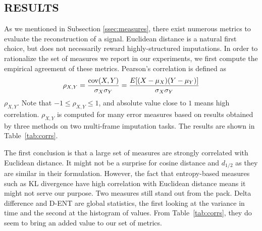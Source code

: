 \documentclass{article}
\begin{document}
\subsection{RESULTS}
\label{ssec:results}
As we mentioned in Subsection \ref{ssec:measures}, there exist
numerous metrics to evaluate the reconstruction of a signal. Euclidean
distance is a natural first choice, but does not necessarily reward
highly-structured imputations. In order to rationalize the set of
measures we report in our experiments, we first compute the
empirical agreement of these metrics.
Pearson's correlation is defined as
\[  \rho_{X,Y}={\mathrm{cov}(X,Y) \over \sigma_X
    \sigma_Y} ={E[(X-\mu_X)(Y-\mu_Y)] \over \sigma_X\sigma_Y}
\]
$\rho_{X,Y}$. Note that $-1 \leq \rho_{X,Y} \leq 1$, and absolute
value close to $1$ means high correlation. $\rho_{X,Y}$ is computed
for many error measures based on results obtained by three methods on
two multi-frame imputation tasks. The results are shown in
Table~\ref{tab:corrs}.

The first conclusion is that a large set of measures are strongly correlated
with Euclidean distance. It might not be a surprise for cosine
distance and $d_{1/2}$ as they are similar in their
formulation. However, the fact that entropy-based measures such as KL divergence
have high correlation with Euclidean distance means it might not serve
our purpose. Two measures still stand out from the pack.
Delta difference and D-ENT are global statistics, the first looking at the
variance in time and the second at the histogram of values. From
Table~\ref{tab:corrs}, they do seem to bring an added value to our set
of metrics.
\end{document}
